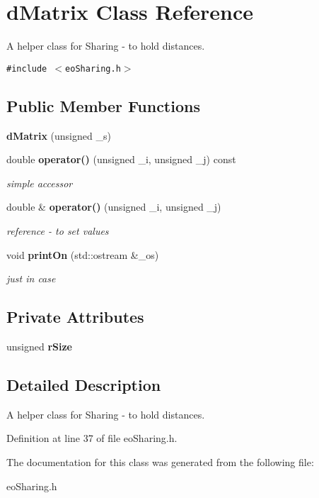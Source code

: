 \section{d\-Matrix Class Reference}
\label{classd_matrix}
A helper class for Sharing - to hold distances.  


{\tt \#include $<$eo\-Sharing.h$>$}

\subsection*{Public Member Functions}
\begin{CompactItemize}
\item 
{\bf d\-Matrix} (unsigned \_\-s)\label{classd_matrix_a0}

\item 
double {\bf operator()} (unsigned \_\-i, unsigned \_\-j) const \label{classd_matrix_a1}

\begin{CompactList}\small\item\em simple accessor \item\end{CompactList}\item 
double \& {\bf operator()} (unsigned \_\-i, unsigned \_\-j)\label{classd_matrix_a2}

\begin{CompactList}\small\item\em reference - to set values \item\end{CompactList}\item 
void {\bf print\-On} (std::ostream \&\_\-os)\label{classd_matrix_a3}

\begin{CompactList}\small\item\em just in case \item\end{CompactList}\end{CompactItemize}
\subsection*{Private Attributes}
\begin{CompactItemize}
\item 
unsigned {\bf r\-Size}\label{classd_matrix_r0}

\end{CompactItemize}


\subsection{Detailed Description}
A helper class for Sharing - to hold distances. 



Definition at line 37 of file eo\-Sharing.h.

The documentation for this class was generated from the following file:\begin{CompactItemize}
\item 
eo\-Sharing.h\end{CompactItemize}
